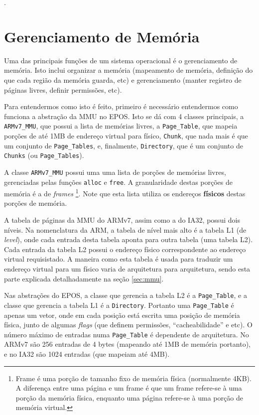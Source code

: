 . 



\section{Gerenciamento de Memória}
\label{sec:gerenciamento}
Uma das principais funções de um sistema operacional é o gerenciamento de memória. Isto inclui organizar a memória (mapeamento de memória, definição do que cada região da memória guarda, etc) e gerenciamento (manter registro de páginas livres, definir permissões, etc).

Para entendermos como isto é feito, primeiro é necessário entendermos como funciona a abstração da MMU no EPOS. Isto se dá com 4 classes principais, a \verb+ARMv7_MMU+, que possui a lista de memórias livres, a \verb+Page_Table+, que mapeia porções de até 1MB de endereço virtual para físico, \verb+Chunk+, que nada mais é que um conjunto de \verb+Page_Tables+, e, finalmente, \verb+Directory+, que é um conjunto de \verb+Chunks+ (ou \verb+Page_Tables+).

A classe \verb+ARMv7_MMU+ possui uma uma lista de porções de memórias livres, gerenciadas pelas funções \verb+alloc+ e \verb+free+. A granularidade destas porções de memória é a de \emph{frames}
\footnote{Frame é uma porção de tamanho fixo de memória física (normalmente 4KB). A diferença entre uma página e um frame é que um frame refere-se à uma porção da memória física, enquanto uma página refere-se à uma porção de memória virtual.}.
Note que esta lista utiliza os endereços \textbf{físicos} destas porções de memória.

A tabela de páginas da MMU do ARMv7, assim como a do IA32, possui dois níveis. Na nomenclatura da ARM, a tabela de nível mais alto é a tabela L1 (de \emph{level}), onde cada entrada desta tabela aponta para outra tabela (uma tabela L2).
Cada entrada da tabela L2 possui o endereço físico correspondente ao endereço virtual requisistado. A maneira como esta tabela é usada para traduzir um endereço virtual para um físico varia de arquitetura para arquitetura, sendo esta parte explicada detalhadamente na seção \ref{sec:mmu}.

Nas abstrações do EPOS, a classe que gerencia a tabela L2 é a \verb+Page_Table+, e a classe que gerencia a tabela L1 é a \verb+Directory+. Portanto uma \verb+Page_Table+ é apenas um vetor, onde em cada posição está escrita uma posição de memória física, junto de algumas \emph{flags} (que definem permissões, ``cacheabilidade'' e etc). O número máximo de entradas numa \verb+Page_Table+ é dependente de arquitetura. No ARMv7 são 256 entradas de 4 bytes (mapeando até 1MB de memória portanto), e no IA32 são 1024 entradas (que mapeiam até 4MB).


